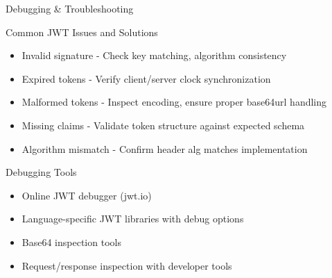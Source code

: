 \documentclass[presentation,aspectratio=169]{beamer}
\begin{document}
\begin{frame}[label={sec:org164154d}]{Debugging \& Troubleshooting}
\begin{block}{Common JWT Issues and Solutions}
\begin{itemize}[<+->]
\item \alert{Invalid signature} - Check key matching, algorithm consistency
\item \alert{Expired tokens} - Verify client/server clock synchronization
\item \alert{Malformed tokens} - Inspect encoding, ensure proper base64url handling
\item \alert{Missing claims} - Validate token structure against expected schema
\item \alert{Algorithm mismatch} - Confirm header alg matches implementation
\end{itemize}
\end{block}
\begin{block}{Debugging Tools}
\begin{itemize}[<+->]
\item Online JWT debugger (jwt.io)
\item Language-specific JWT libraries with debug options
\item Base64 inspection tools
\item Request/response inspection with developer tools
\end{itemize}
\end{block}
\end{frame}
\end{document}
